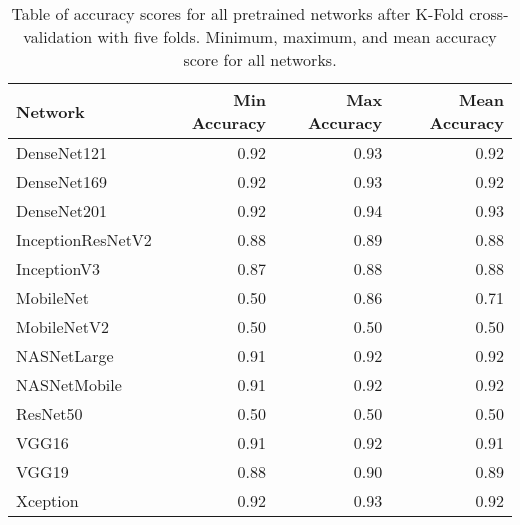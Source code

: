 \documentclass[12pt, notitlepage]{article}
\begin{document}
\begin{table}[h]
    \begin{tabular}{l|r|r|r}
	Network           & Min Accuracy & Max Accuracy & Mean Accuracy \\
	\hline
	DenseNet121       & 0.92         & 0.93         & 0.92          \\
	DenseNet169       & 0.92         & 0.93         & 0.92          \\
	DenseNet201       & 0.92         & 0.94         & 0.93          \\
	InceptionResNetV2 & 0.88         & 0.89         & 0.88          \\
	InceptionV3       & 0.87         & 0.88         & 0.88          \\
	MobileNet         & 0.50         & 0.86         & 0.71          \\
	MobileNetV2       & 0.50         & 0.50         & 0.50          \\
	NASNetLarge       & 0.91         & 0.92         & 0.92          \\
	NASNetMobile      & 0.91         & 0.92         & 0.92          \\
	ResNet50          & 0.50         & 0.50         & 0.50          \\
	VGG16             & 0.91         & 0.92         & 0.91          \\
	VGG19             & 0.88         & 0.90         & 0.89          \\
	Xception          & 0.92         & 0.93         & 0.92         
    \end{tabular}
    \caption{Table of accuracy scores for all pretrained networks after K-Fold cross-validation
    with five folds. Minimum, maximum, and mean accuracy score for all networks.}
    \label{tab:accuracies}
\end{table}
\end{document}
